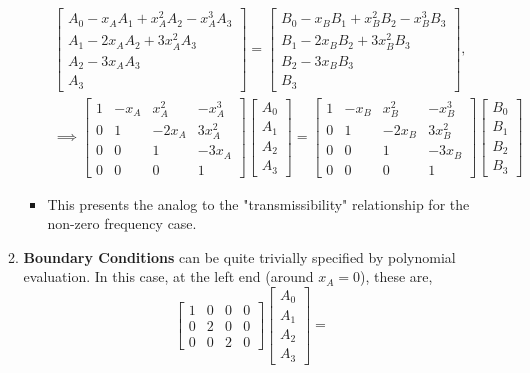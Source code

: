 \documentclass[11pt]{article}
\begin{document}
\begin{enumerate}
\begin{enumerate}
\begin{itemize}
\begin{align*}
	\begin{bmatrix} A_0 - x_A A_1 + x_A^2 A_2 - x_A^3 A_3\\ A_1 - 2x_A A_2 + 3x_A^2 A_3\\ A_2 -3x_A A_3\\ A_3 \end{bmatrix} =
		\begin{bmatrix} B_0 - x_B B_1 + x_B^2 B_2 - x_B^3 B_3\\ B_1 - 2x_B B_2 + 3x_B^2 B_3\\ B_2 -3x_B B_3\\ B_3 \end{bmatrix},\\
\implies \begin{bmatrix} 1 & -x_A & x_A^2 & -x_A^3\\ 0 & 1 & -2x_A & 3x_A^2\\ 0 & 0 & 1 & -3x_A\\ 0 & 0 & 0 & 1 \end{bmatrix}
	\begin{bmatrix} A_0\\ A_1\\ A_2\\ A_3 \end{bmatrix} =
	\begin{bmatrix} 1 & -x_B & x_B^2 & -x_B^3\\ 0 & 1 & -2x_B & 3x_B^2\\ 0 & 0 & 1 & -3x_B\\ 0 & 0 & 0 & 1 \end{bmatrix}
	\begin{bmatrix} B_0\\ B_1\\ B_2\\ B_3 \end{bmatrix}
\end{align*}
\item This presents the analog to the "transmissibility" relationship for the non-zero frequency case.
\end{itemize}
\item \textbf{Boundary Conditions} can be quite trivially specified by polynomial evaluation. In this case, at the left end (around \(x_A=0\)), these are,
$$ \begin{bmatrix} 1 & 0 & 0 & 0\\ 0 & 2 & 0 & 0\\ 0 & 0 & 2 & 0\end{bmatrix}
      \begin{bmatrix} A_0\\ A_1\\ A_2\\ A_3 \end{bmatrix} =
$$
\end{enumerate}
\end{enumerate}
\end{document}
